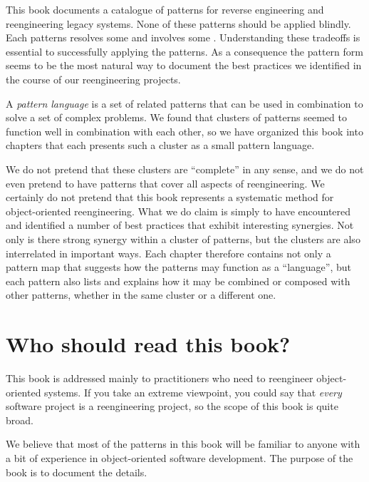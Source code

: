 \documentclass[a4paper,10pt,twoside]{book}
\begin{document}
This book documents a catalogue of patterns for reverse engineering and reengineering legacy systems. None of these patterns should be applied blindly. Each patterns resolves some  and involves some . Understanding these tradeoffs is essential to successfully applying the patterns. As a consequence the pattern form seems to be the most natural way to document the best practices we identified in the course of our reengineering projects.

A \emph{pattern language} is a set of related patterns that can be used in combination to solve a set of complex problems. We found that clusters of patterns seemed to function well in combination with each other, so we have organized this book into chapters that each presents such a cluster as a small pattern language.

We do not pretend that these clusters are ``complete'' in any sense, and we do not even pretend to have patterns that cover all aspects of reengineering. We certainly do not pretend that this book represents a systematic method for object-oriented reengineering. What we do claim is simply to have encountered and identified a number of best practices that exhibit interesting synergies. Not only is there strong synergy within a cluster of patterns, but the clusters are also interrelated in important ways. Each chapter therefore contains not only a pattern map that suggests how the patterns may function as a ``language'', but each pattern also lists and explains how it may be combined or composed with other patterns, whether in the same cluster or a different one. 

\section*{Who should read this book?}

This book is addressed mainly to practitioners who need to reengineer object-oriented systems. If you take an extreme viewpoint, you could say that \emph{every} software project is a reengineering project, so the scope of this book is quite broad.

We believe that most of the patterns in this book will be familiar to anyone with a bit of experience in object-oriented software development. The purpose of the book is to document the details.
\end{document}

